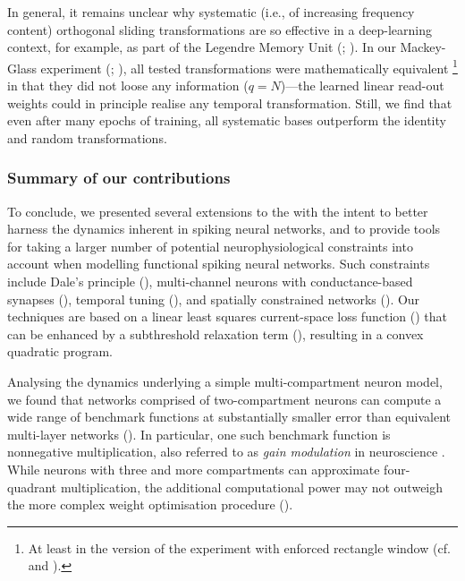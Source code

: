 In general, it remains unclear why systematic (i.e., of increasing frequency content) orthogonal sliding transformations are so effective in a deep-learning context, for example, as part of the Legendre Memory Unit (\LMU; \cite{voelker2019lmu}).
In our Mackey-Glass experiment (; ), all tested transformations were mathematically equivalent%
\footnote{At least in the version of the experiment with enforced rectangle window (cf.~ and ).}
in that they did not loose any information ($q = N$)---the learned linear read-out weights could in principle realise any temporal transformation.
Still, we find that even after many epochs of training, all systematic bases outperform the identity and random transformations.

\subsubsection{Summary of our contributions}

To conclude, we presented several extensions to the \NEF with the intent to better harness the dynamics inherent in spiking neural networks, and to provide tools for taking a larger number of potential neurophysiological constraints into account when modelling functional spiking neural networks.
Such constraints include Dale's principle (), multi-channel neurons with conductance-based synapses (), temporal tuning (), and spatially constrained networks ().
Our techniques are based on a linear least squares current-space loss function () that can be enhanced by a subthreshold relaxation term (), resulting in a convex quadratic program.

Analysing the dynamics underlying a simple multi-compartment neuron model, we found that networks comprised of two-compartment neurons can compute a wide range of benchmark functions at substantially smaller error than equivalent multi-layer networks ().
In particular, one such benchmark function is nonnegative multiplication, also referred to as \emph{gain modulation} in neuroscience \citep{salinas2000gain}.
While neurons with three and more compartments can approximate four-quadrant multiplication, the additional computational power may not outweigh the more complex weight optimisation procedure ().

